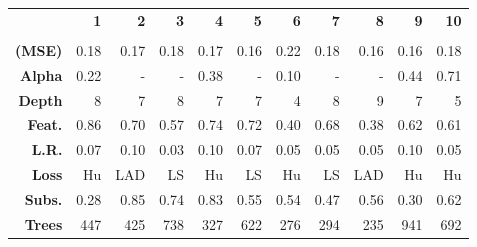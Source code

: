\setcellgapes{1ex}\makegapedcells\centering\begin{tabular*}{\textwidth}{r|@{\extracolsep{\fill}}rrrrrrrrrr}
\toprule
{} & \textbf{1} & \textbf{2} & \textbf{3} & \textbf{4} & \textbf{5} & \textbf{6} & \textbf{7} & \textbf{8} & \textbf{9} & \textbf{10} \\
      &            &            &            &            &            &            &            &            &            &             \\
\midrule
\textbf{(MSE)} &  0.18 &  0.17 &  0.18 &  0.17 &  0.16 &  0.22 &  0.18 &  0.16 &  0.16 &  0.18 \\
\textbf{Alpha} &  0.22 &  - &  - &  0.38 &  - &  0.10 &  - &  - &  0.44 &  0.71 \\
\textbf{Depth} &  8 &  7 &  8 &  7 &  7 &  4 &  8 &  9 &  7 &  5 \\
\textbf{Feat.} &  0.86 &  0.70 &  0.57 &  0.74 &  0.72 &  0.40 &  0.68 &  0.38 &  0.62 &  0.61 \\
\textbf{L.R. } &  0.07 &  0.10 &  0.03 &  0.10 &  0.07 &  0.05 &  0.05 &  0.05 &  0.10 &  0.05 \\
\textbf{Loss } &  Hu &  LAD &  LS &  Hu &  LS &  Hu &  LS &  LAD &  Hu &  Hu \\
\textbf{Subs.} &  0.28 &  0.85 &  0.74 &  0.83 &  0.55 &  0.54 &  0.47 &  0.56 &  0.30 &  0.62 \\
\textbf{Trees} &  447 &  425 &  738 &  327 &  622 &  276 &  294 &  235 &  941 &  692 \\
\bottomrule
\end{tabular*}
